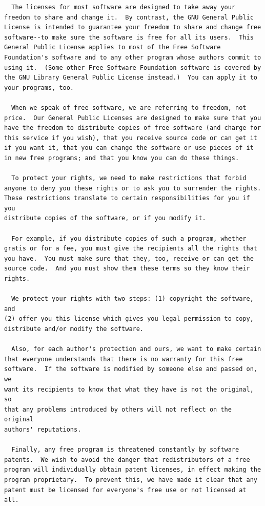\documentclass[mingoth,a4paper]{jsarticle}
\begin{document}
{{{{{{{{{{{{{{{{{{{\begin{multicols}{2}
\begin{fontsize}{6}{6}
\begin{verbatim}
  The licenses for most software are designed to take away your
freedom to share and change it.  By contrast, the GNU General Public
License is intended to guarantee your freedom to share and change free
software--to make sure the software is free for all its users.  This
General Public License applies to most of the Free Software
Foundation's software and to any other program whose authors commit to
using it.  (Some other Free Software Foundation software is covered by
the GNU Library General Public License instead.)  You can apply it to
your programs, too.

  When we speak of free software, we are referring to freedom, not
price.  Our General Public Licenses are designed to make sure that you
have the freedom to distribute copies of free software (and charge for
this service if you wish), that you receive source code or can get it
if you want it, that you can change the software or use pieces of it
in new free programs; and that you know you can do these things.

  To protect your rights, we need to make restrictions that forbid
anyone to deny you these rights or to ask you to surrender the rights.
These restrictions translate to certain responsibilities for you if you
distribute copies of the software, or if you modify it.

  For example, if you distribute copies of such a program, whether
gratis or for a fee, you must give the recipients all the rights that
you have.  You must make sure that they, too, receive or can get the
source code.  And you must show them these terms so they know their
rights.

  We protect your rights with two steps: (1) copyright the software, and
(2) offer you this license which gives you legal permission to copy,
distribute and/or modify the software.

  Also, for each author's protection and ours, we want to make certain
that everyone understands that there is no warranty for this free
software.  If the software is modified by someone else and passed on, we
want its recipients to know that what they have is not the original, so
that any problems introduced by others will not reflect on the original
authors' reputations.

  Finally, any free program is threatened constantly by software
patents.  We wish to avoid the danger that redistributors of a free
program will individually obtain patent licenses, in effect making the
program proprietary.  To prevent this, we have made it clear that any
patent must be licensed for everyone's free use or not licensed at all.


\end{verbatim}
\end{fontsize}
\end{multicols}}}}}}}}}}}}}}}}}}}}
\end{document}
